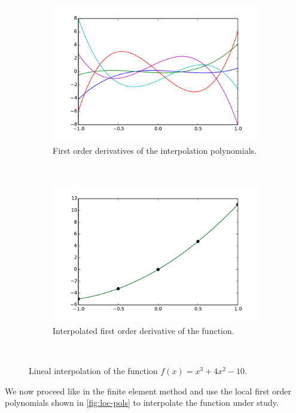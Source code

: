 \begin{figure}[H]
\centering
	\begin{subfigure}[b]{0.45\textwidth}\qquad
		\includegraphics[width=\textwidth]{deriv2.pdf}
		\caption{First order derivatives of the interpolation polynomials. }
	\end{subfigure}\,
%
	\begin{subfigure}[b]{0.45\textwidth}\qquad
		\includegraphics[width=\textwidth]{firstder.pdf}
		\caption{Interpolated first order derivative of the function.}
	\end{subfigure}\\

\caption{Lineal interpolation of the function $f(x) = {x^3} + 4{x^2} - 10$.}
\label{fig:first der}
\end{figure}

We now proceed like in the finite element method and use the local first order polynomials shown in \cref{fig:loc-pols} to interpolate the function under study.

